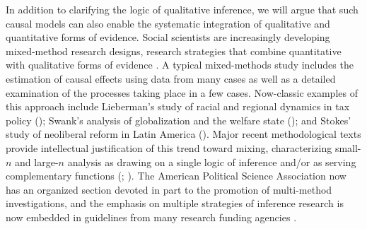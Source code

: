 \documentclass[
  12pt,
]{book}
\begin{document}
In addition to clarifying the logic of qualitative inference, we will argue that such causal models can also enable the systematic integration of qualitative and quantitative forms of evidence. Social scientists are increasingly developing mixed-method research designs, research strategies that combine quantitative with qualitative forms of evidence \citep{small2011conduct}. A typical mixed-methods study includes the estimation of causal effects using data from many cases as well as a detailed examination of the processes taking place in a few cases. Now-classic examples of this approach include Lieberman's study of racial and regional dynamics in tax policy (\citet{lieberman2003race}); Swank's analysis of globalization and the welfare state (\citet{swank2002global}); and Stokes' study of neoliberal reform in Latin America (\citet{stokes2001mandates}). Major recent methodological texts provide intellectual justification of this trend toward mixing, characterizing small-\(n\) and large-\(n\) analysis as drawing on a single logic of inference and/or as serving complementary functions (\citet{king1994designing}; \citet{collier2004sources}). The American Political Science Association now has an organized section devoted in part to the promotion of multi-method investigations, and the emphasis on multiple strategies of inference research is now embedded in guidelines from many research funding agencies \citep{CRESWELL2008}.
\end{document}
